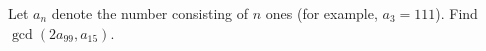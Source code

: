 Let $a_{n}$ denote the number consisting of $n$ ones (for example, $a_{3}=111$). Find $\gcd(2a_{99}, a_{15})$.
